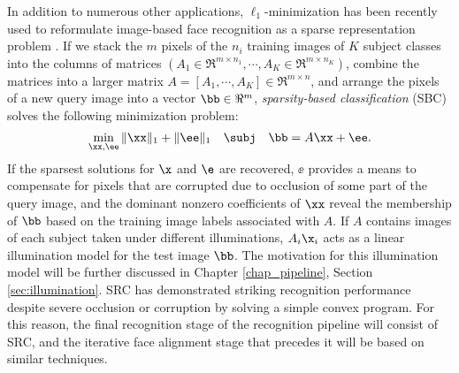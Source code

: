 In addition to numerous other applications, $\ell_1$-minimization has been recently used to reformulate
image-based face recognition as a sparse representation problem
\cite{WrightJ2009-PAMI}.  If we stack the $m$ pixels of the $n_i$ training images of $K$ subject
classes into the columns of matrices $(A_1\in\Re^{m\times n_1}, \cdots, A_K\in\Re^{m\times n_K})$, combine
the matrices into a larger matrix $A = [A_1, \cdots, A_K]\in\Re^{m\times n}$, and arrange the pixels of a new
query image into a vector $\bb\in\Re^m$, \emph{sparsity-based
classification} (SBC) solves the following minimization problem:
\begin{equation}
\min_{\xx, \ee} \| \xx \|_1 + \|\ee\|_1 \quad \subj \quad \bb = A \xx + \ee.
\label{eq:l1min_denoise}
\end{equation}
If the sparsest solutions for $\x$ and $\e$ are recovered, $\ee$ provides a
means to compensate for pixels that are corrupted due to occlusion of some part of the query
image, and the dominant nonzero coefficients of $\xx$ reveal the membership of
$\bb$ based on the training image labels associated with $A$. 
If $A$ contains images of each subject taken under different illuminations, 
$A_i\x_i$ acts as a linear illumination model for the test image $\bb$.  The motivation
for this illumination model will be further discussed in Chapter \ref{chap_pipeline}, Section \ref{sec:illumination}.
SRC has demonstrated striking recognition performance
despite severe occlusion or corruption by solving a simple convex program.  For
this reason, the final recognition stage of the recognition pipeline will consist of
SRC, and the iterative face alignment stage that precedes it will be based on
similar techniques.

